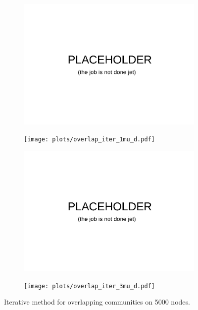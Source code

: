 \begin{figure}
    \centering
    \begin{subfigure}{0.5\textwidth}
    \includegraphics[width=0.8\linewidth]{plots/placeholder.pdf}
    \end{subfigure}%
    \begin{subfigure}{0.5\textwidth}
    \texttt{[image: plots/overlap\_iter\_1mu\_d.pdf]}
    \end{subfigure}
    \begin{subfigure}{0.5\textwidth}
    \includegraphics[width=0.8\linewidth]{plots/placeholder.pdf}
    \end{subfigure}%
    \begin{subfigure}{0.5\textwidth}
    \texttt{[image: plots/overlap\_iter\_3mu\_d.pdf]}
    \end{subfigure}
    
    \caption{Iterative method for overlapping communities on 5000 nodes.}
    \label{fig:iter_overlap_5000N}
\end{figure}

